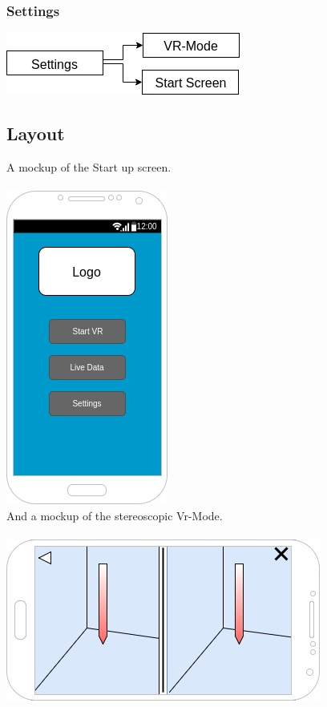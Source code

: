\subsubsection{Settings}

\includegraphics[scale=0.5]{pics/Settings.jpg}

\newpage
\subsection{Layout}

A mockup of the Start up screen.
\\
\\
\includegraphics[scale=0.5]{pics/startScreen_mockup.jpg}
\\

And a mockup of the stereoscopic Vr-Mode.
\\
\\
\includegraphics[scale=0.5]{pics/VRView_mockup.jpg}
